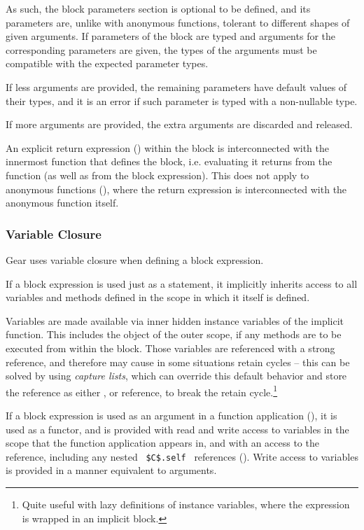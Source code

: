 As such, the block parameters section is optional to be defined, and its parameters are, unlike with anonymous functions, tolerant to different shapes of given arguments. If parameters of the block are typed and arguments for the corresponding parameters are given, the types of the arguments must be compatible with the expected parameter types. 

If less arguments are provided, the remaining parameters have default values of their types, and it is an error if such parameter is typed with a non-nullable type. 

If more arguments are provided, the extra arguments are discarded and released. 

An explicit return expression () within the block is interconnected with the innermost function that defines the block, i.e. evaluating it returns from the function (as well as from the block expression). This does not apply to anonymous functions (), where the return expression is interconnected with the anonymous function itself. 






\subsubsection{Variable Closure}
\label{sec:variable-closure}

Gear uses variable closure when defining a block expression. 

If a block expression is used just as a statement, it implicitly inherits access to all variables and methods defined in the scope in which it itself is defined. 

Variables are made available via inner hidden instance variables of the implicit function. This includes the  object of the outer scope, if any methods are to be executed from within the block. Those variables are referenced with a strong reference, and therefore may cause in some situations retain cycles -- this can be solved by using {\em capture lists}, which can override this default behavior and store the reference as either ,  or  reference, to break the retain cycle.\footnote{Quite useful with lazy definitions of instance variables, where the expression is wrapped in an implicit block.} 

If a block expression is used as an argument in a function application (), it is used as a functor, and is provided with read and write access to variables in the scope that the function application appears in, and with an access to the  reference, including any nested ~\lstinline!$C$.self!~ references (). Write access to variables is provided in a manner equivalent to  arguments. 

